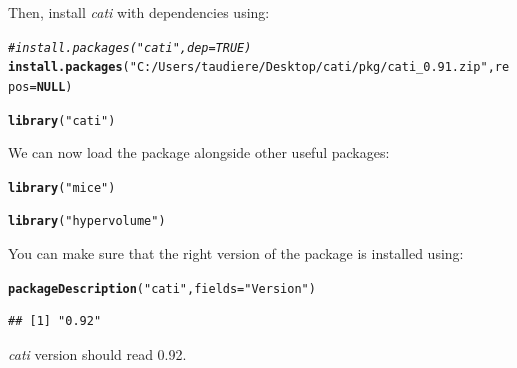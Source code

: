 \documentclass[12pt]{article}\usepackage[]{graphicx}\usepackage[]{color}
\makeatletter
\newcommand{\hlstr}[1]{\textcolor[rgb]{0.192,0.494,0.8}{#1}}%
\newcommand{\hlcom}[1]{\textcolor[rgb]{0.678,0.584,0.686}{\textit{#1}}}%
\newcommand{\hlstd}[1]{\textcolor[rgb]{0.345,0.345,0.345}{#1}}%
\newcommand{\hlkwa}[1]{\textcolor[rgb]{0.161,0.373,0.58}{\textbf{#1}}}%
\newcommand{\hlkwc}[1]{\textcolor[rgb]{0.333,0.667,0.333}{#1}}%
\newcommand{\hlkwd}[1]{\textcolor[rgb]{0.737,0.353,0.396}{\textbf{#1}}}%
\newenvironment{kframe}{%
 \def\at@end@of@kframe{}%
 \ifinner\ifhmode%
  \def\at@end@of@kframe{\end{minipage}}%
  \begin{minipage}{\columnwidth}%
 \fi\fi%
 \def\FrameCommand##1{\hskip\@totalleftmargin \hskip-\fboxsep
 \colorbox{shadecolor}{##1}\hskip-\fboxsep
     \hskip-\linewidth \hskip-\@totalleftmargin \hskip\columnwidth}%
 \MakeFramed {\advance\hsize-\width
   \@totalleftmargin\z@ \linewidth\hsize
   \@setminipage}}%
 {\par\unskip\endMakeFramed%
 \at@end@of@kframe}
\newenvironment{knitrout}{}{} %
\makeatother
\begin{document}
Then, install \textit{cati} with dependencies using:
\begin{knitrout}
\color{fgcolor}\begin{kframe}
\begin{alltt}
\hlcom{#install.packages("cati", dep=TRUE)}
\hlkwd{install.packages}\hlstd{(}\hlstr{"C:/Users/taudiere/Desktop/cati/pkg/cati_0.91.zip"}\hlstd{,} \hlkwc{repos}\hlstd{=}\hlkwa{NULL}\hlstd{)}
\end{alltt}


{\ttfamily\noindent\bfseries\color{errorcolor}{\#\# Error: zip file 'C:/Users/taudiere/Desktop/cati/pkg/cati\_0.91.zip' not found}}\begin{alltt}
\hlkwd{library}\hlstd{(}\hlstr{"cati"}\hlstd{)}
\end{alltt}


{\ttfamily\noindent\itshape\color{messagecolor}{\#\# Loading required package: nlme\\\#\# Loading required package: ade4\\\#\# Loading required package: ape}}\end{kframe}
\end{knitrout}

We can now load the package alongside other useful packages:
\begin{knitrout}
\color{fgcolor}\begin{kframe}
\begin{alltt}
\hlkwd{library}\hlstd{(}\hlstr{"mice"}\hlstd{)}
\end{alltt}


{\ttfamily\noindent\itshape\color{messagecolor}{\#\# Loading required package: Rcpp\\\#\# Loading required package: lattice\\\#\# mice 2.22 2014-06-10}}\begin{alltt}
\hlkwd{library}\hlstd{(}\hlstr{"hypervolume"}\hlstd{)}
\end{alltt}


{\ttfamily\noindent\itshape\color{messagecolor}{\#\# Loading required package: rgl}}\end{kframe}
\end{knitrout}

\noindent You can make sure that the right version of the package is installed using:
\begin{knitrout}
\color{fgcolor}\begin{kframe}
\begin{alltt}
\hlkwd{packageDescription}\hlstd{(}\hlstr{"cati"}\hlstd{,} \hlkwc{fields} \hlstd{=} \hlstr{"Version"}\hlstd{)}
\end{alltt}
\begin{verbatim}
## [1] "0.92"
\end{verbatim}
\end{kframe}
\end{knitrout}
\textit{cati} version should read 0.92.
\end{document}
